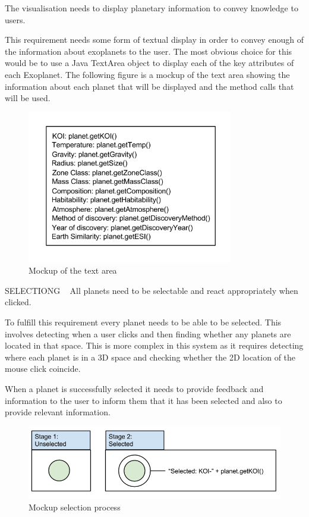 \begin{enumerate}
{\bf
 \item[R1.] The visualisation needs to display planetary information to convey
knowledge to users.
}

  This requirement needs some form of textual display in order to convey enough
of the information about exoplanets to the user. The most obvious choice for
this would be to use a Java TextArea object to display each of the key
attributes of each Exoplanet. The following figure is a mockup of the text area
showing the information about each planet that will be displayed and the method
calls that will be used.

\begin{figure}[H]
  \centering
      \includegraphics[width=0.8\textwidth]{images/textAreaMockup.png}
  \caption{Mockup of the text area}  
\end{figure}

SELECTIONG ~
All planets need to be selectable and react appropriately when
clicked.

To fulfill this requirement every planet needs to be able to be selected. This
involves detecting when a user clicks and then finding whether any planets are
located in that space. This is more complex in this system as it requires
detecting where each planet is in a 3D space and checking whether the 2D
location of the mouse click coincide. 

When a planet is successfully selected it needs to provide feedback and
information to the user to inform them that it has been selected and also to
provide relevant information.

\begin{figure}[H]
  \centering
      \includegraphics[width=.8\textwidth]{images/mockSelected.png}
  \caption{Mockup selection process}  
\end{figure}


\end{enumerate}
